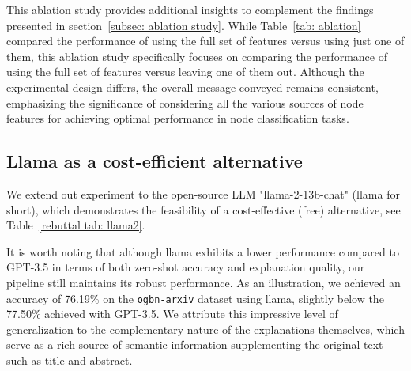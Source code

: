\documentclass{article}
\begin{document}
This ablation study provides additional insights to complement the findings presented in section~\ref{subsec: ablation study}. While Table~\ref{tab: ablation} compared the performance of using the full set of features versus using just one of them, this ablation study specifically focuses on comparing the performance of using the full set of features versus leaving one of them out. Although the experimental design differs, the overall message conveyed remains consistent, emphasizing the significance of considering all the various sources of node features for achieving optimal performance in node classification tasks.
































\subsection{Llama as a cost-efficient alternative}

We extend out experiment to the open-source LLM "llama-2-13b-chat"  (llama for short), which demonstrates the feasibility of a cost-effective (free) alternative, see Table~\ref{rebuttal tab: llama2}.

It is worth noting that although llama exhibits a lower performance compared to GPT-3.5 in terms of both zero-shot accuracy and explanation quality, our pipeline still maintains its robust performance. As an illustration, we achieved an accuracy of 76.19\% on the \texttt{ogbn-arxiv} dataset using llama, slightly below the 77.50\% achieved with GPT-3.5. We attribute this impressive level of generalization to the complementary nature of the explanations themselves, which serve as a rich source of semantic information supplementing the original text such as title and abstract.
\end{document}

